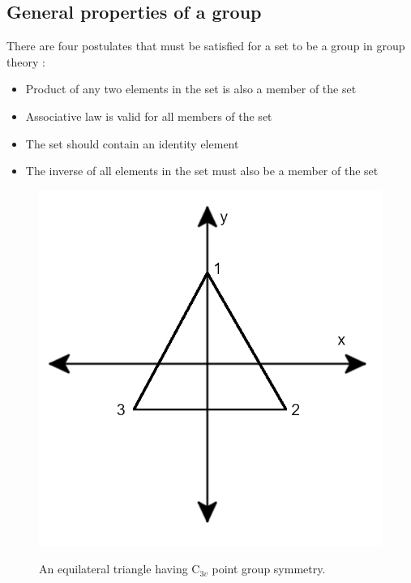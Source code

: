 \documentclass[letterpaper,10pt,doublespacing,edeposit]{uiucthesis2020}
\begin{document}
\begin{mainmatter}
\subsection{General properties of a group}


There are four postulates that must be satisfied for a set to be a group in group theory \cite{Koster1956}:

\begin{itemize}
\item Product of any two elements in the set is also a member of the set
\item Associative law is valid for all members of the set
\item The set should contain an identity element
\item The inverse of all elements in the set must also be a member of the set
\end{itemize}


\begin{figure}
\centering\includegraphics[width=0.5\columnwidth]{figures/ch4/equilateral_triangle.png} \\
\caption{\label{fig:C3v}
An equilateral triangle having C$_{3v}$ point group symmetry.
}
\end{figure}



\end{mainmatter}
\end{document}
